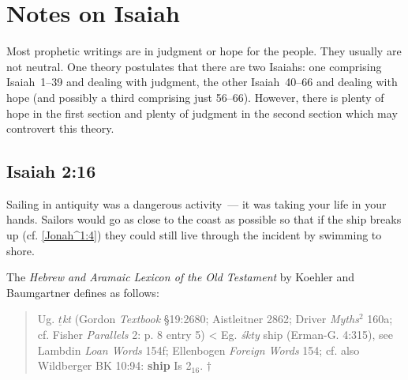 \chapter{Notes on Isaiah}\label{app:isaiah}
Most prophetic writings are in judgment or hope for the people. They usually are not neutral. One theory postulates that there are two Isaiahs: one comprising Isaiah~1--39 and dealing with judgment, the other Isaiah~40--66 and dealing with hope (and possibly a third comprising just 56--66). However, there is plenty of hope in the first section and plenty of judgment in the second section which may controvert this theory.

\section{Isaiah 2:16}\label{app:isa-2-16}
Sailing in antiquity was a dangerous activity~--- it was taking your life in your hands. Sailors would go as close to the coast as possible so that if the ship breaks up (cf. \ref{Jonah^1:4}) they could still live through the incident by swimming to shore.

The \emph{Hebrew and Aramaic Lexicon of the Old Testament} by Koehler and Baumgartner defines  as follows:
\begin{quote}
    Ug. \emph{$\underline{t}$kt} (Gordon \emph{Textbook} \S19:2680; Aistleitner 2862; Driver \emph{Myths}$^2$ 160a; cf. Fisher \emph{Parallels} 2: p. 8 entry 5) < Eg. \emph{\'skty} ship (Erman-G. 4:315), see Lambdin \emph{Loan Words} 154f; Ellenbogen \emph{Foreign Words} 154; cf. also Wildberger BK 10:94: \textbf{ship} Is 2$_{16}$. $\dagger$
\end{quote}

